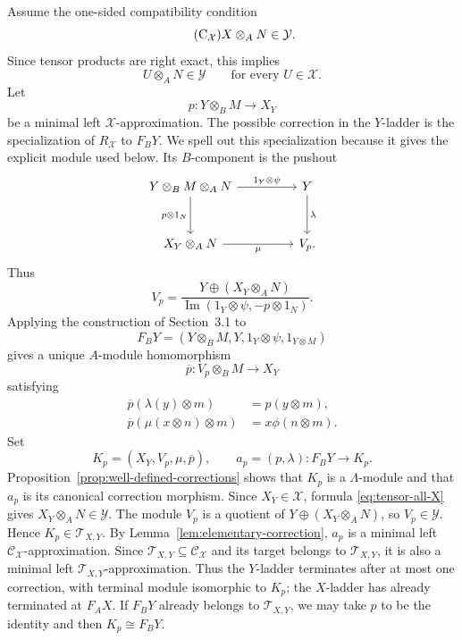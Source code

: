 \documentclass[11pt,reqno]{amsart}
\theoremstyle{definition}
\theoremstyle{remark}
\numberwithin{equation}{section}
\begin{document}
Assume the one-sided compatibility condition
\begin{equation*}\tag{C$_{\mathcal X}$}
 X\otimes_AN\in\mathcal Y.
\end{equation*}
Since tensor products are right exact, this implies
\begin{equation}\label{eq:tensor-all-X}
 U\otimes_AN\in\mathcal Y
 \qquad\text{for every }U\in\mathcal X.
\end{equation}
Let
\[
 p:Y\otimes_BM\longrightarrow X_Y
\]
be a minimal left $\mathcal X$-approximation.  The possible correction in
the $Y$-ladder is the specialization of $R_{\mathcal X}$ to $F_BY$.
We spell out this specialization because it
gives the explicit module used below.  Its $B$-component is the pushout
\begin{equation}\label{eq:pushout}
\begin{tikzcd}[column sep=4.5em,row sep=3.0em]
 Y\otimes_BM\otimes_AN
   \arrow[r,"1_Y\otimes\psi"]
   \arrow[d,"p\otimes1_N"']
 &Y\arrow[d,"\lambda"]\\
 X_Y\otimes_AN\arrow[r,"\mu"']
 &V_p.
\end{tikzcd}
\end{equation}
Thus
\[
 V_p=
 \frac{Y\oplus(X_Y\otimes_AN)}
 {\operatorname{Im}(1_Y\otimes\psi,-p\otimes1_N)}.
\]
Applying the construction of Section~3.1 to
\[
 F_BY=(Y\otimes_BM,Y,1_Y\otimes\psi,1_{Y\otimes M})
\]
gives a unique $A$-module homomorphism
\[
 \overline p:V_p\otimes_BM\longrightarrow X_Y
\]
satisfying
\begin{align*}
 \overline p(\lambda(y)\otimes m)&=p(y\otimes m),\\
 \overline p(\mu(x\otimes n)\otimes m)&=x\phi(n\otimes m).
\end{align*}
Set
\[
 K_p=(X_Y,V_p,\mu,\overline p),
 \qquad
 a_p=(p,\lambda):F_BY\longrightarrow K_p.
\]
Proposition~\ref{prop:well-defined-corrections} shows that $K_p$ is a
$\Lambda$-module and that $a_p$ is its canonical correction morphism.
Since $X_Y\in\mathcal X$, formula \eqref{eq:tensor-all-X} gives
$X_Y\otimes_AN\in\mathcal Y$.  The module $V_p$ is a quotient of
$Y\oplus(X_Y\otimes_AN)$, so $V_p\in\mathcal Y$.  Hence
$K_p\in\mathcal T_{X,Y}$.
By Lemma~\ref{lem:elementary-correction}, $a_p$ is a minimal left
$\mathcal C_{\mathcal X}$-approximation.  Since
$\mathcal T_{X,Y}\subseteq\mathcal C_{\mathcal X}$ and its target belongs
to $\mathcal T_{X,Y}$, it is also a minimal left
$\mathcal T_{X,Y}$-approximation.  Thus the $Y$-ladder terminates after at
most one correction, with terminal module isomorphic to $K_p$; the
$X$-ladder has already terminated at $F_AX$.  If $F_BY$ already belongs to
$\mathcal T_{X,Y}$, we may take $p$ to be the identity and then
$K_p\cong F_BY$.
\end{document}
